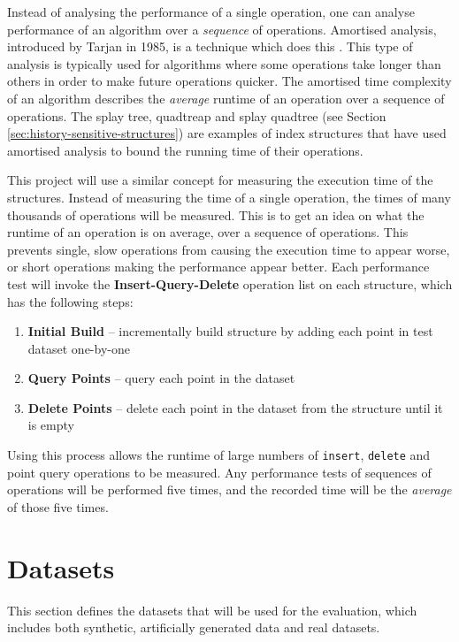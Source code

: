 Instead of analysing the performance of a single operation, one can analyse performance of an algorithm over a \textit{sequence} of operations. Amortised analysis, introduced by Tarjan in 1985, is a technique which does this \cite{amortised-analysis}. This type of analysis is typically used for algorithms where some operations take longer than others in order to make future operations quicker. The amortised time complexity of an algorithm describes the \textit{average} runtime of an operation over a sequence of operations. The splay tree, quadtreap and splay quadtree (see Section \ref{sec:history-sensitive-structures}) are examples of index structures that have used amortised analysis to bound the running time of their operations.

This project will use a similar concept for measuring the execution time of the structures. Instead of measuring the time of a single operation, the times of many thousands of operations will be measured. This is to get an idea on what the runtime of an operation is on average, over a sequence of operations. This prevents single, slow operations from causing the execution time to appear worse, or short operations making the performance appear better. Each performance test will invoke the \textbf{Insert-Query-Delete} operation list on each structure, which has the following steps:
\begin{enumerate}
	\item \textbf{Initial Build} -- incrementally build structure by adding each point in test dataset one-by-one
	\item \textbf{Query Points} -- query each point in the dataset
	\item \textbf{Delete Points} -- delete each point in the dataset from the structure until it is empty
\end{enumerate}
Using this process allows the runtime of large numbers of \texttt{insert}, \texttt{delete} and point query operations to be measured. Any performance tests of sequences of operations will be performed five times, and the recorded time will be the \textit{average} of those five times.

\section{Datasets}
\label{sec:datasets}

This section defines the datasets that will be used for the evaluation, which includes both synthetic, artificially generated data and real datasets.

